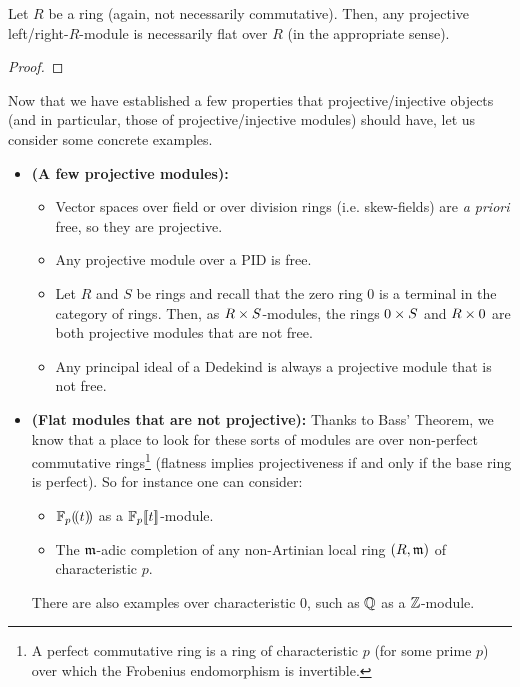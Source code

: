                 \begin{corollary}
                    Let $R$ be a ring (again, not necessarily commutative). Then, any projective left/right-$R$-module is necessarily flat over $R$ (in the appropriate sense). 
                \end{corollary}
                    \begin{proof}
                        
                    \end{proof}
                
                Now that we have established a few properties that projective/injective objects (and in particular, those of projective/injective modules) should have, let us consider some concrete examples. 
                \begin{example} \label{example: projetive_modules}
                    \noindent
                    \begin{itemize}
                        \item \textbf{(A few projective modules):} 
                            \begin{itemize}
                                \item Vector spaces over field or over division rings (i.e. skew-fields) are \textit{a priori} free, so they are projective.
                                \item Any projective module over a PID is free. 
                                \item Let $R$ and $S$ be rings and recall that the zero ring $0$ is a terminal in the category of rings. Then, as $R \x S$-modules, the rings $0 \x S$ and $R \x 0$ are both projective modules that are not free. 
                                \item Any principal ideal of a Dedekind is always a projective module that is not free. 
                            \end{itemize}
                        \item \textbf{(Flat modules that are not projective):} Thanks to Bass' Theorem, we know that a place to look for these sorts of modules are over non-perfect commutative rings\footnote{A perfect commutative ring is a ring of characteristic $p$ (for some prime $p$) over which the Frobenius endomorphism is invertible.} (flatness implies projectiveness if and only if the base ring is perfect). So for instance one can consider:
                            \begin{itemize}
                                \item $\mathbb{F}_p(\!(t)\!)$ as a $\mathbb{F}_p[\![t]\!]$-module.
                                \item The $\mathfrak{m}$-adic completion of any non-Artinian local ring $(R, \mathfrak{m})$ of characteristic $p$.
                            \end{itemize}
                        There are also examples over characteristic $0$, such as $\mathbb{Q}$ as a $\mathbb{Z}$-module.
                    \end{itemize}
                \end{example}
